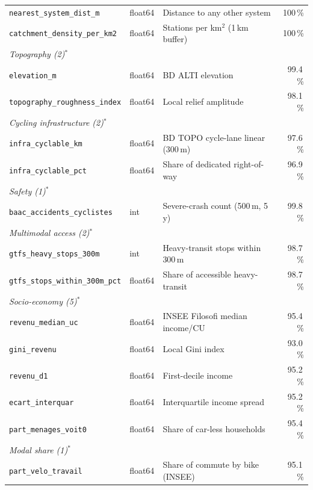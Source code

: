 \documentclass[11pt,a4paper]{article}
\begin{document}
\begin{table}[ht]
\begin{tabular}{@{}lllr@{}}
\quad\texttt{nearest\_system\_dist\_m}      & float64 & Distance to any other system    & 100\,\%\\
\quad\texttt{catchment\_density\_per\_km2}  & float64 & Stations per km$^2$ (1\,km buffer)& 100\,\%\\
\midrule
\multicolumn{4}{l}{\textit{Topography (2)$^\ast$}}\\
\quad\texttt{elevation\_m}                  & float64 & BD ALTI elevation                & 99.4\,\%\\
\quad\texttt{topography\_roughness\_index}  & float64 & Local relief amplitude           & 98.1\,\%\\
\midrule
\multicolumn{4}{l}{\textit{Cycling infrastructure (2)$^\ast$}}\\
\quad\texttt{infra\_cyclable\_km}           & float64 & BD TOPO cycle-lane linear (300\,m) & 97.6\,\%\\
\quad\texttt{infra\_cyclable\_pct}          & float64 & Share of dedicated right-of-way  & 96.9\,\%\\
\midrule
\multicolumn{4}{l}{\textit{Safety (1)$^\ast$}}\\
\quad\texttt{baac\_accidents\_cyclistes}    & int     & Severe-crash count (500\,m, 5\,y)  & 99.8\,\%\\
\midrule
\multicolumn{4}{l}{\textit{Multimodal access (2)$^\ast$}}\\
\quad\texttt{gtfs\_heavy\_stops\_300m}      & int     & Heavy-transit stops within 300\,m   & 98.7\,\%\\
\quad\texttt{gtfs\_stops\_within\_300m\_pct}& float64 & Share of accessible heavy-transit  & 98.7\,\%\\
\midrule
\multicolumn{4}{l}{\textit{Socio-economy (5)$^\ast$}}\\
\quad\texttt{revenu\_median\_uc}            & float64 & INSEE Filosofi median income/CU     & 95.4\,\%\\
\quad\texttt{gini\_revenu}                  & float64 & Local Gini index                    & 93.0\,\%\\
\quad\texttt{revenu\_d1}                    & float64 & First-decile income                 & 95.2\,\%\\
\quad\texttt{ecart\_interquar}              & float64 & Interquartile income spread         & 95.2\,\%\\
\quad\texttt{part\_menages\_voit0}          & float64 & Share of car-less households        & 95.4\,\%\\
\midrule
\multicolumn{4}{l}{\textit{Modal share (1)$^\ast$}}\\
\quad\texttt{part\_velo\_travail}           & float64 & Share of commute by bike (INSEE)    & 95.1\,\%\\
\bottomrule
\end{tabular}
\end{table}
\end{document}
